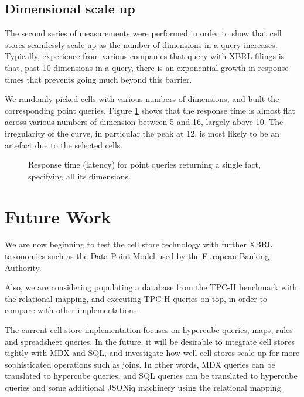 \documentclass{acm_proc_article-sp}
\begin{document}
\subsection{Dimensional scale up}

The second series of measurements were performed in order to show that cell stores seamlessly scale up as the number of dimensions in a query increases. Typically, experience from various companies that query with XBRL filings is that, past 10 dimensions in a query, there is an exponential growth in response times that prevents going much beyond this barrier.

We randomly picked cells with various numbers of dimensions, and built the corresponding point queries. Figure \ref{figure-dimension-scaleup} shows that the response time is almost flat across various numbers of dimension between 5 and 16, largely above 10. The irregularity of the curve, in particular the peak at 12, is most likely to be an artefact due to the selected cells.

\begin{figure}
\caption{Response time (latency) for point queries returning a single fact, specifying all its dimensions.}
\label{figure-dimension-scaleup}
\end{figure}


\section{Future Work}

We are now beginning to test the cell store technology with further XBRL taxonomies such as the Data Point Model used by the European Banking Authority.

Also, we are considering populating a database from the TPC-H benchmark with the relational mapping, and executing TPC-H queries on top, in order to compare with other implementations.

The current cell store implementation focuses on hypercube queries, maps, rules and spreadsheet queries. In the future, it will be desirable to integrate cell stores tightly with MDX and SQL, and investigate how well cell stores scale up for more sophisticated operations such as joins. In other words, MDX queries can be translated to hypercube queries, and SQL queries can be translated to hypercube queries and some additional JSONiq machinery using the relational mapping.
\end{document}
